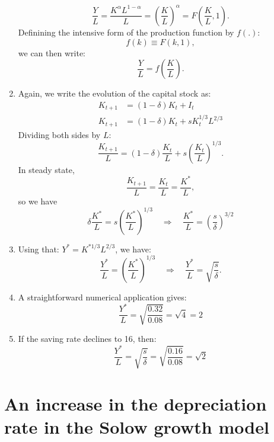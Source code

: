 \documentclass[]{book}
\theoremstyle{definition}
\theoremstyle{definition}
\theoremstyle{definition}
\theoremstyle{remark}
\begin{document}
\begin{enumerate}
  \[\frac{Y}{L}=\frac{K^\alpha L^{1-\alpha}}{L} = \left(\frac{K}{L}\right)^\alpha = F\left(\frac{K}{L}, 1\right).\]
  Definining the intensive form of the production function by \(f(.)\):
  \[f(k) \equiv F(k, 1),\] we can then write:
  \[\frac{Y}{L}=f\left(\frac{K}{L}\right).\]
\item
  Again, we write the evolution of the capital stock as:
  \[\begin{aligned}
  K_{t+1}&=(1-\delta)K_{t}+I_{t}\\
  K_{t+1}&=(1-\delta)K_{t}+sK_{t}^{1/3}L^{2/3}
  \end{aligned}\] Dividing both sides by \(L\):
  \[\frac{K_{t+1}}{L}=(1-\delta)\frac{K_{t}}{L}+s\left(\frac{K_{t}}{L}\right)^{1/3}.\]
  In steady state,
  \[\frac{K_{t+1}}{L}=\frac{K_{t}}{L}=\frac{K^{*}}{L},\] so we have
  \[\delta\frac{K^{*}}{L}=s\left(\frac{K^{*}}{L}\right)^{1/3} \quad \Rightarrow \quad \boxed{\frac{K^{*}}{L}=\left(\frac{s}{\delta}\right)^{3/2}}\]
\item
  Using that: \(Y^{*}=K^{*1/3}L^{2/3}\), we have:
  \[\frac{Y^{*}}{L}=\left(\frac{K^{*}}{L}\right)^{1/3}\quad\Rightarrow\quad\boxed{\frac{Y^{*}}{L}=\sqrt{\frac{s}{\delta}}}.\]
\item
  A straightforward numerical application gives:
  \[\frac{Y^{*}}{L}=\sqrt{\frac{0.32}{0.08}}=\sqrt{4}=2\]
\item
  If the saving rate declines to 16, then:
  \[\frac{Y^{*}}{L}=\sqrt{\frac{s}{\delta}}=\sqrt{\frac{0.16}{0.08}}=\sqrt{2}\]
\end{enumerate}

\section{An increase in the depreciation rate in the Solow growth
model}\label{an-increase-in-the-depreciation-rate-in-the-solow-growth-model}
\end{document}
